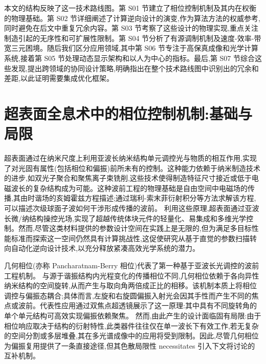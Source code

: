 本文的结构反映了这一技术路线图。第 S01 节建立了相位控制机制及其内在权衡的物理基础。第 S02 节详细阐述了计算逆向设计的演变,作为算法方法的权威参考,同时避免在后文中重复冗余内容。第 S03 节考察了这些设计的物理实现,重点关注制造引起的无序性和可扩展性限制。第 S04 节分析了有源调制机制及速度-效率-带宽三元困境。随后我们区分应用领域,其中第 S06 节专注于高保真成像和光学计算系统,接着第 S05 节处理动态显示架构和以人为中心的指标。最后,第 S07 节综合这些发现,提出跨领域的协同设计策略,明确指出在整个技术路线图中识别出的冗余和差距,以此证明需要集成优化框架。

\section{超表面全息术中的相位控制机制:基础与局限}\label{ux8d85ux8868ux9762ux5168ux606fux672fux4e2dux7684ux76f8ux4f4dux63a7ux5236ux673aux5236ux57faux7840ux4e0eux5c40ux9650}

超表面通过在纳米尺度上利用亚波长纳米结构单元调控光与物质的相互作用,实现了对光固有属性(包括相位和偏振)前所未有的控制。这种能力依赖于纳米制造技术的进步,如双光子聚合和聚焦离子束铣削,这些技术使得制造特征尺寸接近或低于电磁波长的复杂结构成为可能。这种波前工程的物理基础是自由空间中电磁场的传播,其由时谐场的亥姆霍兹方程描述;通过瑞利-索末菲衍射积分等方法求解该方程,可以描述次级球面子波如何干涉形成传播的波前。\citep{doi_10_21236_ada421453_63603a3f} \citep{doi_10_1364_ol_509688_f6e1ff85} 利用这些原理,超表面通过亚波长微/纳结构操控光场,实现了超越传统体块元件的轻量化、易集成和多维光学控制。然而,尽管这类材料提供的参数设计空间在实践上是无限的,但为满足多目标性能标准而探索这一空间仍然具有计算挑战性,这促使研究从基于直觉的参数扫描转向自动化逆向设计技术,以充分释放紧凑高效光学系统的潜力。\citep{doi_10_1021_acsphotonics_3c00572_fda8f742} \citep{doi_10_1002_advs_202504634_52bafb6c} \citep{doi_10_1038_s41377_026_02272_y_42e58df2}

几何相位(亦称 Pancharatnam-Berry 相位)代表了第一种基于亚波长光调控的波前工程机制。\citep{doi_10_1364_oe_27_015750_2ec65356} \citep{doi_10_1364_oe_568932_9e61cb80} 与源于谐振结构内光程变化的传播相位不同,几何相位依赖于各向异性纳米结构的空间旋转,从而产生与取向角两倍成正比的相移。该机制本质上将相位调控与偏振态耦合;具体而言,左旋和右旋圆偏振入射光会因其手性而产生不同的焦点或波前。代表性应用通过双焦点超透镜展示了这一原理:其中具有不同旋转角的单个单元结构可高效实现偏振依赖聚焦。\citep{doi_10_3390_s22051889_f6b907d2} 然而,由此产生的设计面临固有局限:由于相位响应取决于结构的衍射特性,此类器件往往仅在单一波长下有效工作,若无复杂的空间分割或多层堆叠,其在多光谱成像中的应用将受到限制。因此,尽管几何相位为偏振复用提供了一条直接途径,但其色散局限性 necessitates 引入下文将讨论的互补机制。\citep{doi_10_3390_s22051889_f6b907d2} \citep{doi_10_1117_1_apn_2_1_016010_57069347}

